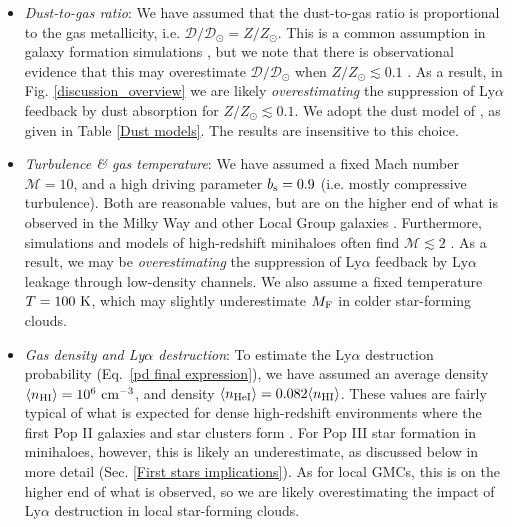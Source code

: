 \documentclass[fleqn,usenatbib]{mnras}
\newcommand\HI{\ion{H}{I}\xspace} %
\newcommand\HeI{\ion{He}{I}\xspace} %
\begin{document}
\begin{itemize}
    \item \textit{Dust-to-gas ratio}: We have assumed that the dust-to-gas ratio is proportional to the gas metallicity, i.e. $\mathscr{D}/\mathscr{D}_{\odot} = Z/Z_{\odot}$. This is a common assumption in galaxy formation simulations \citep[e.g.][]{Kimm2017minihaloes,Agertz2020, Hopkins2023}, but we note that there is observational evidence that this may overestimate $\mathscr{D}/\mathscr{D}_{\odot}$ when $Z/Z_{\odot} \lesssim 0.1$ \citep{Remy2014}. As a result, in Fig. \ref{discussion_overview} we are likely \textit{overestimating} the suppression of Ly$\alpha$ feedback by dust absorption for $Z/Z_{\odot} \lesssim 0.1$. We adopt the dust model of \cite{Hensley2023}, as given in Table \ref{Dust models}. The results are insensitive to this choice. 
    
    \item \textit{Turbulence \& gas temperature}: We have assumed a fixed Mach number $\mathcal{M} = 10$, and a high driving parameter $b_{\rm s} = 0.9$ (i.e. mostly compressive turbulence). Both are reasonable values, but are on the higher end of what is observed in the Milky Way and other Local Group galaxies \citep[e.g.][]{Orkisz2017, Syed2020, Wang2020,Sharda2022_turbulenceobs}. Furthermore, simulations and models of high-redshift minihaloes often find $\mathcal{M} \lesssim 2$ \citep{Greif2011_movingmesh, Safranek2012, Wise2019, Nebrin2022, Sugimura2023_PopIII}. As a result, we may be \textit{overestimating} the suppression of Ly$\alpha$ feedback by Ly$\alpha$ leakage through low-density channels. We also assume a fixed temperature $T = 100 ~ \rm K$, which may slightly underestimate $M_{\rm F}$ in colder star-forming clouds. 
    
    \item \textit{Gas density and Ly$\alpha$ destruction}: To estimate the Ly$\alpha$ destruction probability (Eq.~\ref{pd final expression}), we have assumed an average \HI density $\langle n_{\rm HI} \rangle = 10^6 ~ \rm cm^{-3}$, and \HeI density $\langle n_{\rm HeI} \rangle = 0.082 \langle n_{\rm HI} \rangle$. These values are fairly typical of what is expected for dense high-redshift environments where the first Pop II galaxies and star clusters form \citep{Kimm2016_GC, Nebrin2022, Adamo2024}. For Pop III star formation in minihaloes, however, this is likely an underestimate, as discussed below in more detail (Sec. \ref{First stars implications}). As for local GMCs, this is on the higher end of what is observed, so we are likely overestimating the impact of Ly$\alpha$ destruction in local star-forming clouds.
    

\end{itemize}
\end{document}
